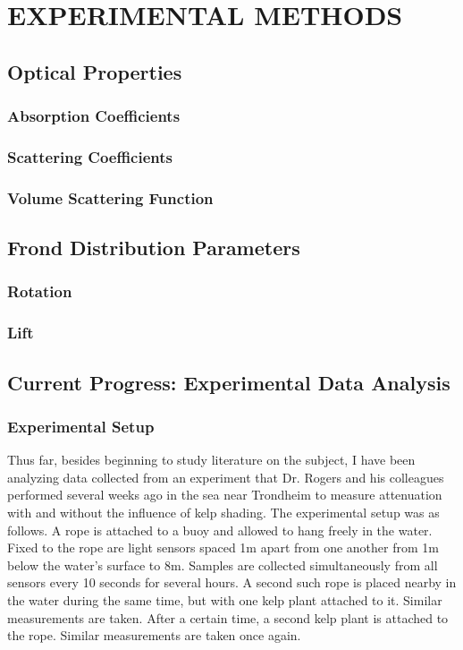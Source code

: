 \chapter{EXPERIMENTAL METHODS} \label{ch:experiment}

\section{Optical Properties}
\subsection{Absorption Coefficients}
\subsection{Scattering Coefficients}
\subsection{Volume Scattering Function}

\section{Frond Distribution Parameters}
\subsection{Rotation}
\subsection{Lift}

\section{Current Progress: Experimental Data Analysis}

\subsection{Experimental Setup}
Thus far, besides beginning to study literature on the subject, I have been analyzing data collected from an experiment that Dr. Rogers and his colleagues performed several weeks ago in the sea near Trondheim to measure attenuation with and without the influence of kelp shading. The experimental setup was as follows. A rope is attached to a buoy and allowed to hang freely in the water. Fixed to the rope are light sensors spaced 1m apart from one another from 1m below the water's surface to 8m. Samples are collected simultaneously from all sensors every 10 seconds for several hours. A second such rope is placed nearby in the water during the same time, but with one kelp plant attached to it. Similar measurements are taken. After a certain time, a second kelp plant is attached to the rope. Similar measurements are taken once again.

